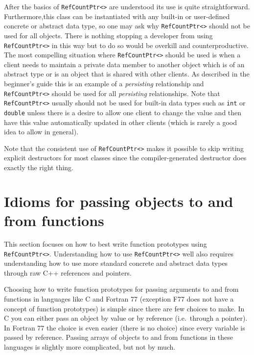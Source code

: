 After the basics of {}\texttt{Ref\-Count\-Ptr<>} are understood its
use is quite straightforward.  Furthermore,this class can be
instantiated with any built-in or user-defined concrete or abstract
data type, so one may ask why {}\texttt{Ref\-Count\-Ptr<>} should not
be used for all objects.  There is nothing stopping a developer from
using {}\texttt{Ref\-Count\-Ptr<>} in this way but to do so would be
overkill and counterproductive. The most compelling situation where
{}\texttt{Ref\-Count\-Ptr<>} should be used is when a client needs to
maintain a private data member to another object which is of an
abstract type or is an object that is shared with other clients.  As
described in the beginner's guide
{}\cite{ref:RefCountPtrBeginnersGuide} this is an example of a
{}\textit{persisting} relationship and
{}\texttt{Ref\-Count\-Ptr<>} should be used for all
{}\textit{persisting} relationships.  Note that
{}\texttt{Ref\-Count\-Ptr<>} usually should not be used for built-in
data types such as {}\texttt{int} or {}\texttt{double} unless there is
a desire to allow one client to change the value and then have this
value automatically updated in other clients (which is rarely a good
idea to allow in general).

Note that the consistent use of {}\texttt{Ref\-Count\-Ptr<>} makes it
possible to skip writing explicit destructors for most classes since
the compiler-generated destructor does exactly the right thing.

%
\section{Idioms for passing objects to and from functions}
\label{rcp:sec:passing-args}
%

This section focuses on how to best write function prototypes using
{}\texttt{Ref\-Count\-Ptr<>}.  Understanding how to use
{}\texttt{Ref\-Count\-Ptr<>} well also requires understanding how to
use more standard concrete and abstract data types through raw C++
references and pointers.

Choosing how to write function prototypes for passing arguments to and
from functions in languages like C and Fortran 77 (exception F77 does
not have a concept of function prototypes) is simple since there are
few choices to make.  In C you can either pass an object by value or
by reference (i.e.~through a pointer).  In Fortran 77 the choice is
even easier (there is no choice) since every variable is passed by
reference.  Passing arrays of objects to and from functions in these
languages is slightly more complicated, but not by much.

